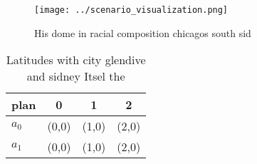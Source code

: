 \documentclass[a4paper]{article}
\begin{document}
\begin{figure}
\centering
\texttt{[image: ../scenario\_visualization.png]}
\caption{His dome in racial composition chicagos south sid
}
\end{figure}
 
\begin{table}
\begin{adjustbox}{width=0.5\columnwidth}
\begin{tabular}{|l|l|l|l|}
\hline
\textbf{plan} & \multicolumn{1}{c|}{\textbf{0}} & \multicolumn{1}{c|}{\textbf{1}} & \multicolumn{1}{c|}{\textbf{2}} \\ \hline
\textbf{$a_0$}  & (0,0) & (1,0) & (2,0) \\ \hline
\textbf{$a_1$}  & (0,0) & (1,0) & (2,0) \\ \hline
\end{tabular}
\end{adjustbox}
\caption{Latitudes with city glendive and sidney Itsel the
}
\end{table}
\end{document}
